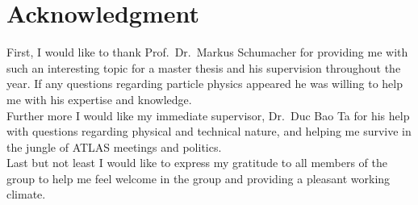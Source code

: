 \thispagestyle{plain}
\chapter*{Acknowledgment}
\vspace{2cm}

First, I would like to thank Prof.\ Dr.\ Markus Schumacher for providing me with such an interesting topic
for a master thesis and his supervision throughout the year.
If any questions regarding particle physics appeared he was willing to help me with his expertise and knowledge.\\[0.5cm]

Further more I would like my immediate supervisor, Dr.\ Duc Bao Ta for his help with questions regarding physical and technical nature,
and helping me survive in the jungle of ATLAS meetings and politics. \\[0.5cm]

Last but not least I would like to express my gratitude to all members of the group to help me feel welcome in the group
and providing a pleasant working climate.
